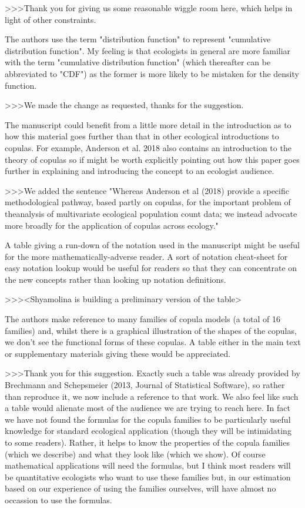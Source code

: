 >>>Thank you for giving us some reasonable wiggle room here, which helps in light of 
other constraints.

The authors use the term "distribution function" to represent "cumulative distribution 
function".  My feeling is that ecologists in general are more familiar with the term 
"cumulative distribution function" (which thereafter can be abbreviated to "CDF") as the 
former is more likely to be mistaken for the density function.

>>>We made the change as requested, thanks for the suggestion.

The manuscript could benefit from a little more detail in the introduction as to how 
this material goes further than that in other ecological introductions to copulas.  
For example, Anderson et al. 2018 also contains an introduction to the theory of copulas 
so if might be worth explicitly pointing out how this paper goes further in explaining 
and introducing the concept to an ecologist audience.

>>>We added the sentence "Whereas Anderson et al (2018) provide a specific methodological 
pathway, based partly on copulas, for the important problem of theanalysis of multivariate 
ecological population count data; we instead advocate more broadly for the application of 
copulas across ecology."

A table giving a run-down of the notation used in the manuscript might be useful for the 
more mathematically-adverse reader.  A sort of notation cheat-sheet for easy notation 
lookup would be useful for readers so that they can concentrate on the new concepts rather 
than looking up notation definitions.

>>><Shyamolina is building a preliminary version of the table>

The authors make reference to many families of copula models (a total of 16 families) and, 
whilst there is a graphical illustration of the shapes of the copulas, we don't see the 
functional forms of these copulas.  A table either in the main text or supplementary materials 
giving these would be appreciated.
 
>>>Thank you for this suggestion. Exactly such a table was already provided by Brechmann 
and Schepsmeier (2013, Journal of Statistical Software), so rather than reproduce it, we
now include a reference to that work. We also feel like such a table would alienate most
of the audience we are trying to reach here. In fact we have not found the formulas
for the copula families to be particularly useful knowledge for standard ecological 
application (though they will be intimidating to some readers). Rather, it helps to 
know the properties of the copula families (which we describe) and what they look 
like (which we show). Of course mathematical applications will need the formulas, but 
I think most readers will be quantitative ecologists who want to use these families 
but, in our estimation based on our experience of using the families ourselves, will 
have almost no occassion to use the formulas.
